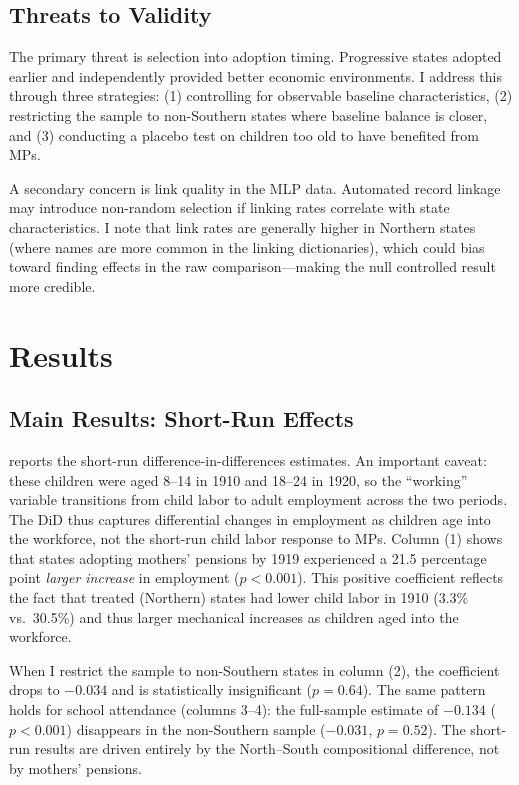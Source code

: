 \documentclass[12pt]{article}
\begin{document}
\subsection{Threats to Validity}

The primary threat is selection into adoption timing. Progressive states adopted earlier and independently provided better economic environments. I address this through three strategies: (1) controlling for observable baseline characteristics, (2) restricting the sample to non-Southern states where baseline balance is closer, and (3) conducting a placebo test on children too old to have benefited from MPs.

A secondary concern is link quality in the MLP data. Automated record linkage may introduce non-random selection if linking rates correlate with state characteristics. I note that link rates are generally higher in Northern states (where names are more common in the linking dictionaries), which could bias toward finding effects in the raw comparison---making the null controlled result more credible.


\section{Results}

\subsection{Main Results: Short-Run Effects}



 reports the short-run difference-in-differences estimates. An important caveat: these children were aged 8--14 in 1910 and 18--24 in 1920, so the ``working'' variable transitions from child labor to adult employment across the two periods. The DiD thus captures differential changes in employment as children age into the workforce, not the short-run child labor response to MPs. Column (1) shows that states adopting mothers' pensions by 1919 experienced a 21.5 percentage point \emph{larger increase} in employment ($p < 0.001$). This positive coefficient reflects the fact that treated (Northern) states had lower child labor in 1910 (3.3\% vs.\ 30.5\%) and thus larger mechanical increases as children aged into the workforce.

When I restrict the sample to non-Southern states in column (2), the coefficient drops to $-0.034$ and is statistically insignificant ($p = 0.64$). The same pattern holds for school attendance (columns 3--4): the full-sample estimate of $-0.134$ ($p < 0.001$) disappears in the non-Southern sample ($-0.031$, $p = 0.52$). The short-run results are driven entirely by the North--South compositional difference, not by mothers' pensions.
\end{document}
